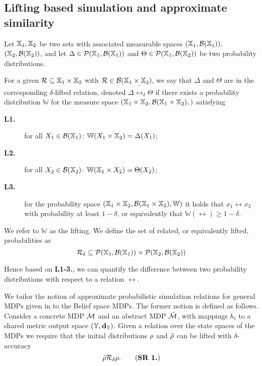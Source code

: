 \documentclass{ifacconf}
\begin{document}
\subsection{Lifting based simulation  and approximate similarity}

	Let ${\mathbb{X}}_1,{\mathbb{X}}_2$ be two sets with associated measurable spaces $({\mathbb{X}}_1,\mathcal B({\mathbb{X}}_1)),$ $({\mathbb{X}}_2,\mathcal B({\mathbb{X}}_2))$,
	and let   $\Delta\in \mathcal{P}({\mathbb{X}}_1,\mathcal B({\mathbb{X}}_1)) $ and  $\Theta\in \mathcal{P}({\mathbb{X}}_1,\mathcal B({\mathbb{X}}_2)) $ be two probability distributions. 
	
For a given 
	$\mathcal{R}\subseteq {\mathbb{X}}_1\times {\mathbb{X}}_2$ with $\mathcal{R}\in \mathcal B({\mathbb{X}}_1\times {\mathbb{X}}_2)$, we say that  $\Delta$ and $ \Theta$ are in the corresponding $\delta$-lifted relation, denoted $\Delta \bar \rel_\delta \Theta$  if there exists a probability distribution $\mathbb W$ for the measure space $({\mathbb{X}}_1\times {\mathbb{X}}_2,\mathcal B({\mathbb{X}}_1\times {\mathbb{X}}_2),)$
	satisfying { \setlength{\parskip}{-1pt}\setlength{\parsep}{0pt}
		\begin{description}
			\item[\textbf{L1.}] for all $X_1\in \mathcal{B}({\mathbb{X}}_1)$: $\mathbb W(X_1\times {\mathbb{X}}_2)=\Delta(X_1)$;
			\item [\textbf{L2.}] for all $X_2\in \mathcal{B}({\mathbb{X}}_2)$:  $\mathbb W({\mathbb{X}}_1\times X_2)=\Theta(X_2)$;
			\item[\textbf{L3.}] for the probability space  $({\mathbb{X}}_1\times {\mathbb{X}}_2,\mathcal B({\mathbb{X}}_1\times {\mathbb{X}}_2), \mathbb W)$ it holds that
			$x_1\rel x_2$ with probability at least $1-\delta$, or equivalently that $\mathbb{W}\left(\rel\right)\geq1-\delta$.
	\end{description}}%
	
We refer to  $\mathbb W$ as the lifting. We define 
the set of related, or equivalently lifted, probabilities as 
	\[\relax\mathcal{R}_\delta\subseteq \mathcal{P}({\mathbb{X}}_1,\mathcal B({\mathbb{X}}_1))\times \mathcal{P}({\mathbb{X}}_2,\mathcal B({\mathbb{X}}_2))\] 


Hence based on \textbf{L1-3.}, we can quantify the difference between two probability distributions with respect to a relation $\rel$.

 
We tailor the   notion of approximate probabilistic simulation relations for general MDPs given in \citep{haesaert2017verification} to the Belief space MDPs.
  The former notion is defined as follows. 
Consider a concrete MDP $\mathcal{M}$ and an abstract  MDP $\tilde{\mathcal{M}}$, with mappings $h_i$ to a shared {metric} output space  $({\mathbb{Y}},\mathbf{d}_{\mathbb{Y}})$.  
Given a relation over the state spaces of the MDPs we require that the initial distributions $\rho$ and $\tilde{\rho}$ can be lifted with $\delta$-accuracy
\begin{equation}
\tilde\init \bar \rel_\delta \init.
	\tag{\textbf{SR 1.}}
\end{equation}
  
\end{document}
